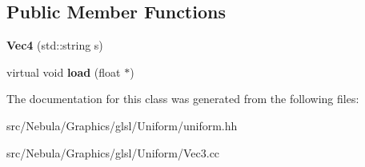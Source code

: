 \subsection*{\-Public \-Member \-Functions}
\begin{DoxyCompactItemize}
\item 
\hypertarget{classNeb_1_1glsl_1_1Uniform_1_1Scalar_1_1Vec4_a1e9c061fa7bf37160ecaa5cbb147ddcb}{{\bfseries \-Vec4} (std\-::string s)}\label{classNeb_1_1glsl_1_1Uniform_1_1Scalar_1_1Vec4_a1e9c061fa7bf37160ecaa5cbb147ddcb}

\item 
\hypertarget{classNeb_1_1glsl_1_1Uniform_1_1Scalar_1_1Vec4_ac789b262241f8e23c42c79e4ea573cd1}{virtual void {\bfseries load} (float $\ast$)}\label{classNeb_1_1glsl_1_1Uniform_1_1Scalar_1_1Vec4_ac789b262241f8e23c42c79e4ea573cd1}

\end{DoxyCompactItemize}


\-The documentation for this class was generated from the following files\-:\begin{DoxyCompactItemize}
\item 
src/\-Nebula/\-Graphics/glsl/\-Uniform/uniform.\-hh\item 
src/\-Nebula/\-Graphics/glsl/\-Uniform/\-Vec3.\-cc\end{DoxyCompactItemize}
